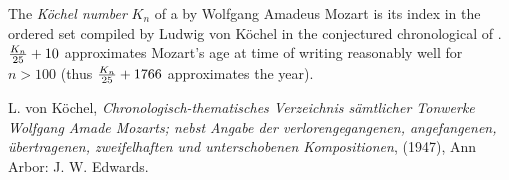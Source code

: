 \documentclass[12pt]{article}
\begin{document}
The {\em K\"ochel number} $K_n$ of a  by Wolfgang Amadeus Mozart is its index in the ordered set compiled by Ludwig von K\"ochel in the conjectured chronological  of . ${{K_n} \over {25}} + 10$ approximates Mozart's age at time of writing reasonably well for $n > 100$ (thus ${{K_n} \over {25}} + 1766$ approximates the year).

\begin{thebibliography}{5}
 L. von K\"ochel, {\it Chronologisch-thematisches Verzeichnis s\"amtlicher Tonwerke Wolfgang Amade Mozarts; nebst Angabe der verlorengegangenen, angefangenen, \"ubertragenen, zweifelhaften und unterschobenen Kompositionen}, (1947), Ann Arbor: J. W. Edwards.
\end{thebibliography}
\end{document}
